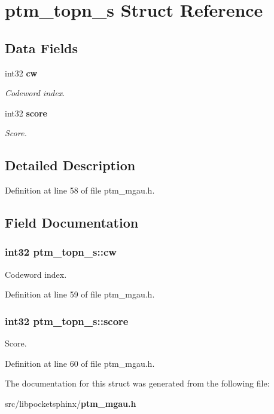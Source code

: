 \section{ptm\+\_\+topn\+\_\+s Struct Reference}
\label{structptm__topn__s}
\subsection*{Data Fields}
\begin{DoxyCompactItemize}
\item 
int32 {\bf cw}
\begin{DoxyCompactList}\small\item\em Codeword index. \end{DoxyCompactList}\item 
int32 {\bf score}
\begin{DoxyCompactList}\small\item\em Score. \end{DoxyCompactList}\end{DoxyCompactItemize}


\subsection{Detailed Description}


Definition at line 58 of file ptm\+\_\+mgau.\+h.



\subsection{Field Documentation}
\subsubsection[{cw}]{\setlength{\rightskip}{0pt plus 5cm}int32 ptm\+\_\+topn\+\_\+s\+::cw}\label{structptm__topn__s_a8a46095488efefa2714214a7a74117b1}


Codeword index. 



Definition at line 59 of file ptm\+\_\+mgau.\+h.

\subsubsection[{score}]{\setlength{\rightskip}{0pt plus 5cm}int32 ptm\+\_\+topn\+\_\+s\+::score}\label{structptm__topn__s_aa2080ad2d4f038cdbfbf46bf90884f56}


Score. 



Definition at line 60 of file ptm\+\_\+mgau.\+h.



The documentation for this struct was generated from the following file\+:\begin{DoxyCompactItemize}
\item 
src/libpocketsphinx/{\bf ptm\+\_\+mgau.\+h}\end{DoxyCompactItemize}

